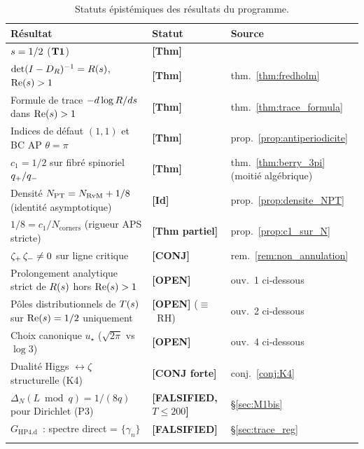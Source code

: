 \begin{longtable}{@{}p{8cm}p{2.5cm}p{4cm}@{}}
\toprule
\textbf{Résultat} & \textbf{Statut} & \textbf{Source}\\
\midrule
\endhead
$s = 1/2$ ($\textbf{T1}$) & \textbf{[Thm]} & \cite{PT_M1}\\
$\det(I - D_R)^{-1} = R(s)$, $\operatorname{Re}(s) > 1$ & \textbf{[Thm]} & thm.~\ref{thm:fredholm}\\
Formule de trace $-d\log R/ds$ dans $\operatorname{Re}(s) > 1$ & \textbf{[Thm]} & thm.~\ref{thm:trace_formula}\\
Indices de défaut $(1,1)$ et BC AP $\theta = \pi$ & \textbf{[Thm]} & prop.~\ref{prop:antiperiodicite}\\
$c_1 = 1/2$ sur fibré spinoriel $q_{+}/q_{-}$ & \textbf{[Thm]} & thm.~\ref{thm:berry_3pi} (moitié algébrique)\\
Densité $N_{\mathrm{PT}} = N_{\mathrm{RvM}} + 1/8$ (identité asymptotique) & \textbf{[Id]} & prop.~\ref{prop:densite_NPT}\\
$1/8 = c_1/N_{\mathrm{corners}}$ (rigueur APS stricte) & \textbf{[Thm partiel]} & prop.~\ref{prop:c1_sur_N}\\
$\zeta_{+}\,\zeta_{-} \ne 0$ sur ligne critique & \textbf{[CONJ]} & rem.~\ref{rem:non_annulation}\\
Prolongement analytique strict de $R(s)$ hors $\operatorname{Re}(s) > 1$ & \textbf{[OPEN]} & ouv.~1 ci-dessous\\
Pôles distributionnels de $T(s)$ sur $\operatorname{Re}(s) = 1/2$ uniquement & \textbf{[OPEN]} ($\equiv$~RH) & ouv.~2 ci-dessous\\
Choix canonique $u_\star$ ($\sqrt{2\pi}$ vs $\log 3$) & \textbf{[OPEN]} & ouv.~4 ci-dessous\\
Dualité Higgs $\leftrightarrow \zeta$ structurelle (K4) & \textbf{[CONJ forte]} & conj.~\ref{conj:K4}\\
$\Delta_N(L \bmod q) = 1/(8q)$ pour Dirichlet (P3) & \textbf{[FALSIFIED, $T \le 200$]} & \S\ref{sec:M1bis}\\
$G_{\mathrm{HP4.d}}$~: spectre direct = $\{\gamma_n\}$ & \textbf{[FALSIFIED]} & \S\ref{sec:trace_reg}\\
\bottomrule
\caption{Statuts épistémiques des résultats du programme.}
\label{tab:statuts}
\end{longtable}

